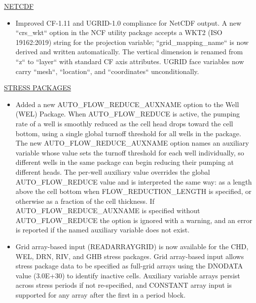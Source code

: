 \underline{NETCDF}
\begin{itemize}
\item Improved CF-1.11 and UGRID-1.0 compliance for NetCDF output. A new ``crs\_wkt`` option in the NCF utility package accepts a WKT2 (ISO 19162:2019) string for the projection variable; ``grid\_mapping\_name`` is now derived and written automatically. The vertical dimension is renamed from ``z`` to ``layer`` with standard CF axis attributes. UGRID face variables now carry ``mesh``, ``location``, and ``coordinates`` unconditionally.
\end{itemize}

\underline{STRESS PACKAGES}
\begin{itemize}
\item Added a new AUTO\_FLOW\_REDUCE\_AUXNAME option to the Well (WEL) Package. When AUTO\_FLOW\_REDUCE is active, the pumping rate of a well is smoothly reduced as the cell head drops toward the cell bottom, using a single global turnoff threshold for all wells in the package. The new AUTO\_FLOW\_REDUCE\_AUXNAME option names an auxiliary variable whose value sets the turnoff threshold for each well individually, so different wells in the same package can begin reducing their pumping at different heads. The per-well auxiliary value overrides the global AUTO\_FLOW\_REDUCE value and is interpreted the same way: as a length above the cell bottom when FLOW\_REDUCTION\_LENGTH is specified, or otherwise as a fraction of the cell thickness. If AUTO\_FLOW\_REDUCE\_AUXNAME is specified without AUTO\_FLOW\_REDUCE the option is ignored with a warning, and an error is reported if the named auxiliary variable does not exist.
\item Grid array-based input (READARRAYGRID) is now available for the CHD, WEL, DRN, RIV, and GHB stress packages.  Grid array-based input allows stress package data to be specified as full-grid arrays using the DNODATA value (3.0E+30) to identify inactive cells.  Auxiliary variable arrays persist across stress periods if not re-specified, and CONSTANT array input is supported for any array after the first in a period block.
\end{itemize}

